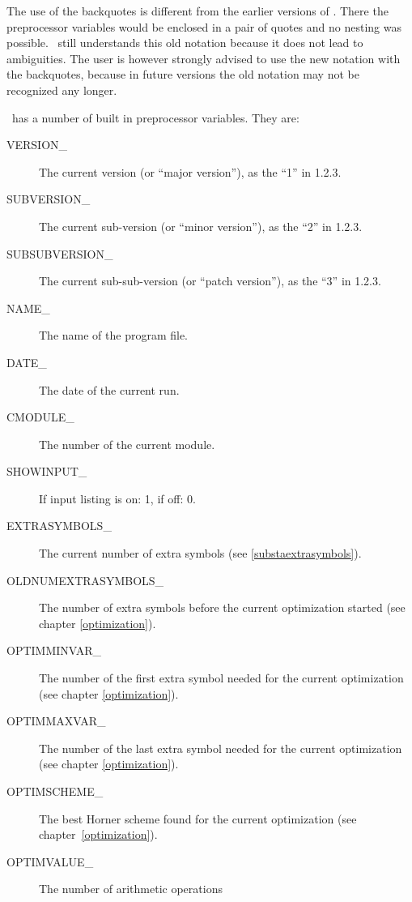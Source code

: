The use of the backquotes is different from the earlier versions of \FORM\@. 
There the preprocessor variables would be enclosed in a pair of quotes and 
no nesting was possible. \FORM\ still understands this old 
notation because it does not lead to ambiguities. The user is however 
strongly advised to use the new notation with the backquotes, because in 
future versions the old notation may not be recognized 
any longer.

\noindent \FORM\ has a number of built in preprocessor variables. They are:

\begin{description}
\item[VERSION\_]  The current version (or ``major version''), as the ``1'' in 1.2.3.
\item[SUBVERSION\_]  The current sub-version (or ``minor version''), as the ``2'' in 1.2.3.
\item[SUBSUBVERSION\_]  The current sub-sub-version (or ``patch version''), as the ``3'' in 1.2.3.
\item[NAME\_]        The name of the program file.
\item[DATE\_]        The date of the current run.
\item[CMODULE\_]     The number of the current module.
\item[SHOWINPUT\_]   If input listing is on: 1, if off: 0.
\item[EXTRASYMBOLS\_]  The current number of extra symbols
       (see \ref{substaextrasymbols}).
\item[OLDNUMEXTRASYMBOLS\_]  The number of extra symbols
            before the current optimization started (see chapter \ref{optimization}).
\item[OPTIMMINVAR\_]  The number of the first extra symbol needed
               for the current optimization (see chapter \ref{optimization}).
\item[OPTIMMAXVAR\_]  The number of the last extra symbol needed
               for the current optimization (see chapter \ref{optimization}).
\item[OPTIMSCHEME\_]  The best Horner scheme found 
               for the current optimization (see chapter~\ref{optimization}).
\item[OPTIMVALUE\_]  The number of arithmetic operations 

\end{description}
